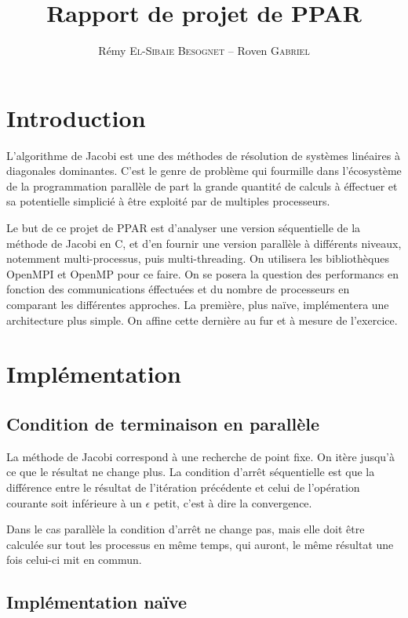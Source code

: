 \documentclass[a4paper]{article}
\title{Rapport de projet de PPAR}
\author{Rémy \textsc{El-Sibaie Besognet} -- Roven \textsc{Gabriel}}
\begin{document}
\maketitle


\section{Introduction}

L'algorithme de Jacobi est une des méthodes de résolution de systèmes
linéaires à diagonales dominantes. C'est le genre de problème qui
fourmille dans l'écosystème de la programmation parallèle de part la
grande quantité de calculs à éffectuer et sa potentielle simplicié à
être exploité par de multiples processeurs.

Le but de ce projet de PPAR est d'analyser une version séquentielle de
la méthode de Jacobi en C, et d'en fournir une version parallèle à
différents niveaux, notemment multi-processus, puis
multi-threading. On utilisera les bibliothèques OpenMPI et OpenMP pour
ce faire. On se posera la question des performancs en fonction des
communications éffectuées et du nombre de processeurs en comparant les
différentes approches. La première, plus naïve, implémentera une
architecture plus simple. On affine cette dernière au fur et à mesure
de l'exercice.

\section{Implémentation} 

\subsection{Condition de terminaison en parallèle}

La méthode de Jacobi correspond à une recherche de point fixe. On
itère jusqu'à ce que le résultat ne change plus. La condition d'arrêt
séquentielle est que la différence entre le résultat de l'itération
précédente et celui de l'opération courante soit inférieure à un
$\epsilon$ petit, c'est à dire la convergence.

Dans le cas parallèle la condition d'arrêt ne change pas, mais elle
doit être calculée sur tout les processus en même temps, qui auront,
le même résultat une fois celui-ci mit en commun.

\subsection{Implémentation naïve}
\end{document}
